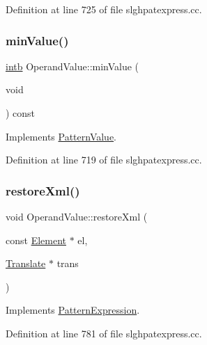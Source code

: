 Definition at line 725 of file slghpatexpress.\+cc.

\mbox{\label{class_operand_value_a5be26ae272c87ca0e0bbbc52c627c62a}} 
\subsubsection{\texorpdfstring{minValue()}{minValue()}}
{\footnotesize\ttfamily \mbox{\hyperlink{types_8h_aa925ba3e627c2df89d5b1cfe84fb8572}{intb}} Operand\+Value\+::min\+Value (\begin{DoxyParamCaption}\item[{void}]{ }\end{DoxyParamCaption}) const\hspace{0.3cm}{\ttfamily [virtual]}}



Implements \mbox{\hyperlink{class_pattern_value_a0dbf85240fe6310e36596fea3bb02f2e}{Pattern\+Value}}.



Definition at line 719 of file slghpatexpress.\+cc.

\mbox{\label{class_operand_value_a65387cdd12b8e6135bd9899c76dd2f39}} 
\subsubsection{\texorpdfstring{restoreXml()}{restoreXml()}}
{\footnotesize\ttfamily void Operand\+Value\+::restore\+Xml (\begin{DoxyParamCaption}\item[{const \mbox{\hyperlink{class_element}{Element}} $\ast$}]{el,  }\item[{\mbox{\hyperlink{class_translate}{Translate}} $\ast$}]{trans }\end{DoxyParamCaption})\hspace{0.3cm}{\ttfamily [virtual]}}



Implements \mbox{\hyperlink{class_pattern_expression_ad8986afdddbe7a8b64fdcf10478b5715}{Pattern\+Expression}}.



Definition at line 781 of file slghpatexpress.\+cc.

